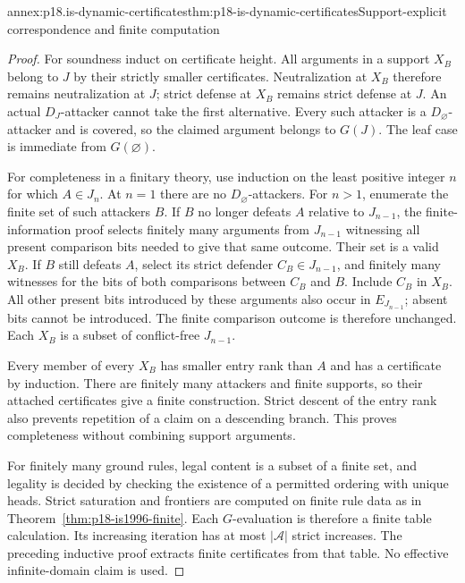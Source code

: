 \begin{annexitem}{annex:p18.is-dynamic-certificates}{thm:p18-is-dynamic-certificates}{Support-explicit correspondence and finite computation}
\begin{proof}
For soundness induct on certificate height.
All arguments in a support \(X_B\) belong to \(J\) by their
strictly smaller certificates. Neutralization at \(X_B\)
therefore remains neutralization at \(J\); strict defense at
\(X_B\) remains strict defense at \(J\).
An actual \(D_J\)-attacker cannot take the first alternative.
Every such attacker is a \(D_\varnothing\)-attacker and is
covered, so the claimed argument belongs to \(G(J)\).
The leaf case is immediate from \(G(\varnothing)\).

For completeness in a finitary theory, use induction on the
least positive integer \(n\) for which \(A\in J_n\).
At \(n=1\) there are no \(D_\varnothing\)-attackers.
For \(n>1\), enumerate the finite set of such attackers \(B\).
If \(B\) no longer defeats \(A\) relative to \(J_{n-1}\),
the finite-information proof selects finitely many arguments
from \(J_{n-1}\) witnessing all present comparison bits needed
to give that same outcome. Their set is a valid \(X_B\).
If \(B\) still defeats \(A\), select its strict defender
\(C_B\in J_{n-1}\), and finitely many witnesses for the bits
of both comparisons between \(C_B\) and \(B\).
Include \(C_B\) in \(X_B\). All other present bits introduced
by these arguments also occur in \(E_{J_{n-1}}\); absent bits
cannot be introduced. The finite comparison outcome is therefore
unchanged. Each \(X_B\) is a subset of conflict-free \(J_{n-1}\).

Every member of every \(X_B\) has smaller entry rank than \(A\)
and has a certificate by induction. There are finitely many
attackers and finite supports, so their attached certificates
give a finite construction. Strict descent of the entry rank
also prevents repetition of a claim on a descending branch.
This proves completeness without combining support arguments.

For finitely many ground rules, legal content is a subset of a
finite set, and legality is decided by checking the existence
of a permitted ordering with unique heads. Strict saturation
and frontiers are computed on finite rule data as in
Theorem~\ref{thm:p18-is1996-finite}. Each \(G\)-evaluation is
therefore a finite table calculation. Its increasing iteration
has at most \(|\mathcal A|\) strict increases.
The preceding inductive proof extracts finite certificates
from that table. No effective infinite-domain claim is used.
\end{proof}
\end{annexitem}


